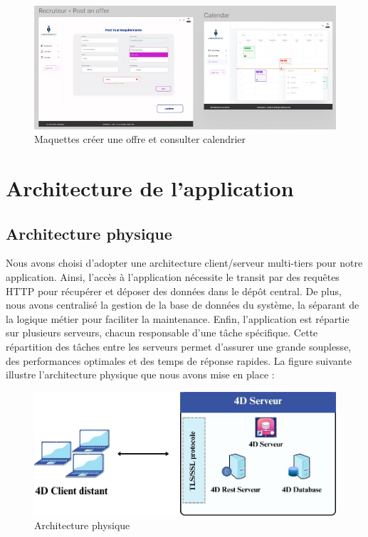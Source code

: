 \begin{figure}[htbp]
   \centering
   \includegraphics[scale=1.2]{Images/5.jpg} 
   \caption{Maquettes créer une offre et consulter calendrier}
   \label{fig:maquette5}
\end{figure}


\section{Architecture de l'application}
\subsection{Architecture physique}
Nous avons choisi d'adopter une architecture client/serveur 
multi-tiers pour notre application. Ainsi, l'accès à 
l'application nécessite le transit par des requêtes HTTP pour 
récupérer et déposer des données dans le dépôt central. De plus, 
nous avons centralisé la gestion de la base de données du système, 
la séparant de la logique métier pour faciliter la maintenance. 
Enfin, l'application est répartie sur plusieurs serveurs, chacun 
responsable d'une tâche spécifique. Cette répartition des tâches 
entre les serveurs permet d'assurer une grande souplesse, 
des performances optimales et des temps de réponse rapides. 
La figure suivante illustre l'architecture physique que nous avons mise en place :


\begin{figure}[htbp]
   \centering
   \includegraphics[scale=0.6]{Images/physique.jpg} %
   \caption{Architecture physique}
   \label{fig:physiqueArch}
\end{figure}

